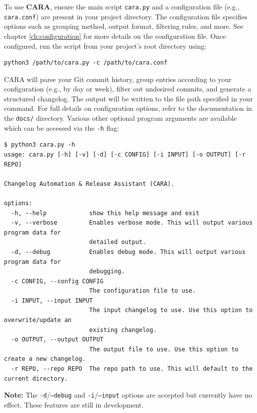 To use \textbf{CARA}, ensure the main script \texttt{cara.py} and a configuration file (e.g., \texttt{cara.conf}) are present in your project directory. The configuration file specifies options such as grouping method, output format, filtering rules, and more. See chapter \ref{ch:configuration} for more details on the configuration file. Once configured, run the script from your project's root directory using:
\begin{lstlisting}[style=terminalstyle]
python3 /path/to/cara.py -c /path/to/cara.conf
\end{lstlisting}
CARA will parse your Git commit history, group entries according to your configuration (e.g., by day or week), filter out undesired commits, and generate a structured changelog. The output will be written to the file path specified in your command. For full details on configuration options, refer to the documentation in the \texttt{docs/} directory. Various other optional program arguments are available which can be accessed via the \texttt{-h} flag:
\begin{lstlisting}[style=terminalstyle]
$ python3 cara.py -h
usage: cara.py [-h] [-v] [-d] [-c CONFIG] [-i INPUT] [-o OUTPUT] [-r REPO]

Changelog Automation & Release Assistant (CARA).

options:
  -h, --help            show this help message and exit
  -v, --verbose         Enables verbose mode. This will output various program data for
                        detailed output.
  -d, --debug           Enables debug mode. This will output various program data for
                        debugging.
  -c CONFIG, --config CONFIG
                        The configuration file to use.
  -i INPUT, --input INPUT
                        The input changelog to use. Use this option to overwrite/update an
                        existing changelog.
  -o OUTPUT, --output OUTPUT
                        The output file to use. Use this option to create a new changelog.
  -r REPO, --repo REPO  The repo path to use. This will default to the current directory.
\end{lstlisting}

\noindent\textbf{Note:} The \texttt{-d}/\texttt{--debug} and \texttt{-i}/\texttt{--input} options are accepted but currently have no effect. These features are still in development.

